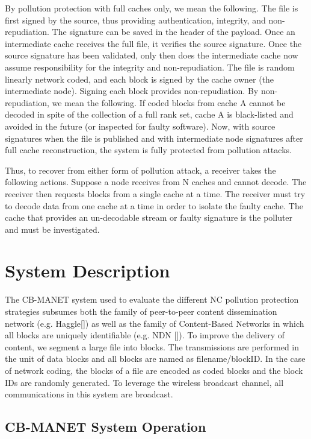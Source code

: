 By pollution protection with full caches only, we mean the following. The file is first signed by the source, thus providing authentication, integrity, and non-repudiation. The signature can be saved in the header of the payload. Once an intermediate cache receives the full file, it verifies the source signature. Once the source signature has been validated, only then does the intermediate cache now assume responsibility for the integrity and non-repudiation. The file is random linearly network coded, and each block is signed by the cache owner (the intermediate node). Signing each block provides non-repudiation. By non-repudiation, we mean the following. If coded blocks from cache A cannot be decoded in spite of the collection of a full rank set, cache A is black-listed and avoided in the future (or inspected for faulty software). Now, with source signatures when the file is published and with intermediate node signatures after full cache reconstruction, the system is fully protected from pollution attacks.

Thus, to recover from either form of pollution attack, a receiver takes the following actions. Suppose a node receives from N caches and cannot decode. The receiver then requests blocks from a single cache at a time. The receiver must try to decode data from one cache at a time in order to isolate the faulty cache. The cache that provides an un-decodable stream or faulty signature  is the polluter and must be investigated. 



\section{System Description}

The CB-MANET system used to evaluate the different NC pollution protection strategies 
subsumes both the family of peer-to-peer content dissemination network (e.g. Haggle[]) as well as the family of Content-Based Networks in which all blocks are uniquely identifiable (e.g. NDN []). To improve the delivery of content, we segment a large file into blocks. The transmissions are performed in the unit of data blocks and all blocks are named as filename/blockID. In the case of network coding, the blocks of a file are encoded as coded blocks and the block IDs are randomly generated. To leverage the wireless broadcast channel, all communications in this system are broadcast. 

\subsection{CB-MANET System Operation}

